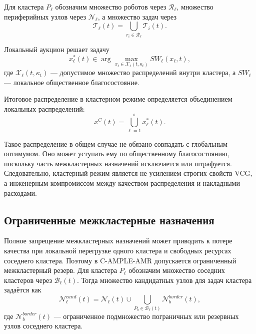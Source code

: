 Для кластера $P_\ell$ обозначим множество роботов через $\mathcal{R}_\ell$, множество периферийных узлов через $\mathcal{N}_\ell$, а множество задач через
\begin{equation}
    \mathcal{T}_\ell(t)=\bigcup_{r_i\in\mathcal{R}_\ell}\mathcal{T}_i(t).
    \label{eq:ch5_cluster_tasks}
\end{equation}

Локальный аукцион решает задачу
\begin{equation}
    x^*_\ell(t) \in \arg\max_{x_\ell \in \mathcal{X}_\ell(t,\kappa_t)} SW_\ell(x_\ell,t),
    \label{eq:ch5_local_auction}
\end{equation}
где $\mathcal{X}_\ell(t,\kappa_t)$ --- допустимое множество распределений внутри кластера, а $SW_\ell$ --- локальное общественное благосостояние.

Итоговое распределение в кластерном режиме определяется объединением локальных распределений:
\begin{equation}
    x^{C}(t)=\bigcup_{\ell=1}^{s} x^*_\ell(t).
    \label{eq:ch5_cluster_allocation}
\end{equation}

Такое распределение в общем случае не обязано совпадать с глобальным оптимумом. Оно может уступать ему по общественному благосостоянию, поскольку часть межкластерных назначений исключается или штрафуется. Следовательно, кластерный режим является не усилением строгих свойств VCG, а инженерным компромиссом между качеством распределения и накладными расходами.

\subsection{Ограниченные межкластерные назначения}

Полное запрещение межкластерных назначений может приводить к потере качества при локальной перегрузке одного кластера и свободных ресурсах соседнего кластера. Поэтому в C-AMPLE-AMR допускается ограниченный межкластерный резерв. Для кластера $P_\ell$ обозначим множество соседних кластеров через $\mathcal{B}_\ell(t)$. Тогда множество кандидатных узлов для задач кластера задаётся как
\begin{equation}
    \mathcal{N}^{cand}_\ell(t)=\mathcal{N}_\ell(t)\cup\bigcup_{P_b\in\mathcal{B}_\ell(t)}\mathcal{N}^{border}_b(t),
    \label{eq:ch5_candidate_nodes}
\end{equation}
где $\mathcal{N}^{border}_b(t)$ --- ограниченное подмножество пограничных или резервных узлов соседнего кластера.

